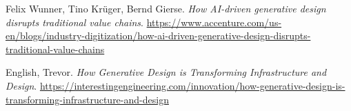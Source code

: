 \begin{thebibliography}{99}
     Felix Wunner, Tino Krüger, Bernd Gierse. \textit{How AI-driven generative design disrupts traditional value chains}. \url{https://www.accenture.com/us-en/blogs/industry-digitization/how-ai-driven-generative-design-disrupts-traditional-value-chains}
    
     English, Trevor. \textit{How Generative Design is Transforming Infrastructure and Design}. \url{https://interestingengineering.com/innovation/how-generative-design-is-transforming-infrastructure-and-design}



\end{thebibliography}